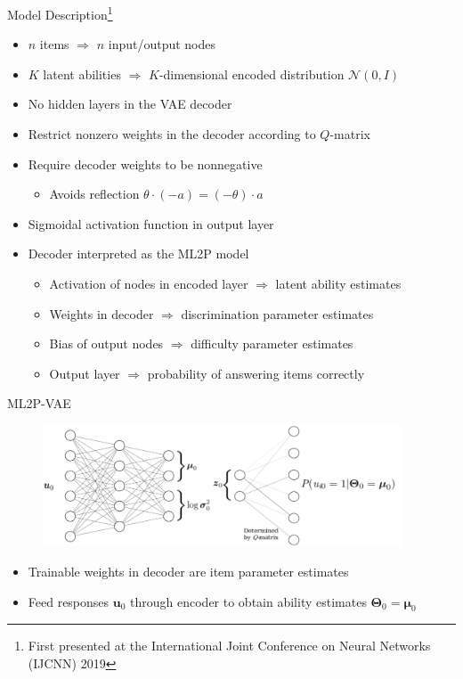 \documentclass{beamer}
\newcommand{\vect}[1]{\boldsymbol{#1}}
\theoremstyle{definition}
\begin{document}
\begin{frame}{Model Description\footnote{First presented at the International Joint Conference on Neural Networks (IJCNN) 2019}}
  \small
\begin{itemize}
  \item $n$ items $\Rightarrow$ $n$ input/output nodes
  \item $K$ latent abilities $\Rightarrow$ $K$-dimensional encoded distribution $\mathcal{N}(0,I)$
\item<2-> No hidden layers in the VAE decoder
\item<2-> Restrict nonzero weights in the decoder according to $Q$-matrix
\item<2-> Require decoder weights to be nonnegative 
  \begin{itemize}
    \item Avoids reflection $\theta\cdot (-a) = (-\theta)\cdot a$
  \end{itemize}
\item<3-> Sigmoidal activation function in output layer
\item<4-> Decoder interpreted as the ML2P model
  \begin{itemize}
    \item<5-> Activation of nodes in encoded layer $\Rightarrow$ latent ability estimates 
    \item<5-> Weights in decoder $\Rightarrow$ discrimination parameter estimates
    \item<5-> Bias of output nodes $\Rightarrow$ difficulty parameter estimates
    \item<5-> Output layer $\Rightarrow$ probability of answering items correctly
  \end{itemize}
\end{itemize}
\end{frame}

\begin{frame}{ML2P-VAE}
\begin{figure}
  \includegraphics[width=0.95\textwidth]{../img/ml2p_vae_ind.png}
\end{figure}
\begin{itemize}
  \item Trainable weights in decoder are item parameter estimates
  \item Feed responses $\vect u_0$ through encoder to obtain ability estimates $\vect \Theta_0 = \vect \mu_0$
\end{itemize}
\end{frame}
\end{document}
